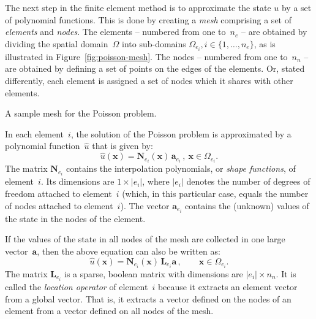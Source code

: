 

The next step in the finite element method is to approximate the state
$u$ by a set of polynomial functions. This is done by creating a
\emph{mesh} comprising a set of \emph{elements} and \emph{nodes}. The
elements -- numbered from one to~$n_e$ -- are obtained by dividing the
spatial domain~$\Omega$ into sub-domains $\Omega_{e_i}, i \in \{1,
\ldots, n_e\}$, as is illustrated in Figure~\ref{fig:poisson-mesh}.
The nodes -- numbered from one to~$n_n$ -- are obtained by defining a
set of points on the edges of the elements. Or, stated differently,
each element is assigned a set of nodes which it shares with other
elements.
\begin{Figure}

  \begin{center}
  \end{center}

  \caption{A sample mesh for the Poisson problem.}

  \label{fig:poisson-mesh}

\end{Figure}

\BlankLine
In each element~$i$, the solution of the Poisson problem is
approximated by a polynomial function~$\hat{u}$ that is given by:
\begin{displaymath}
  \hat{u}(\bm{x}) = \bm{N}_{e_i}(\bm{x}) \, \bm{a}_{e_i} \, , \ \bm{x}
  \in \Omega_{e_i}.
\end{displaymath}
The matrix $\bm{N}_{e_i}$ contains the interpolation polynomials, or
\emph{shape functions}, of element~$i$.  Its dimensions are $1 \times
|e_i|$, where $|e_i|$ denotes the number of degrees of freedom
attached to element~$i$ (which, in this particular case, equals the
number of nodes attached to element~$i$).  The vector $\bm{a}_{e_i}$
contains the (unknown) values of the state in the nodes of the
element.

If the values of the state in all nodes of the mesh are collected in
one large vector~$\bm{a}$, then the above equation can also be written
as:
\begin{displaymath}
  \hat{u}(\bm{x}) = \bm{N}_{e_i}(\bm{x}) \, \bm{L}_{e_i} \bm{a}
  \, , \qquad \bm{x} \in \Omega_{e_i}.
\end{displaymath}
The matrix $\bm{L}_{e_i}$ is a sparse, boolean matrix with dimensions
are $|e_i| \times n_n$. It is called the \emph{location operator} of
element~$i$ because it extracts an element vector from a global
vector. That is, it extracts a vector defined on the nodes of an
element from a vector defined on all nodes of the mesh.

